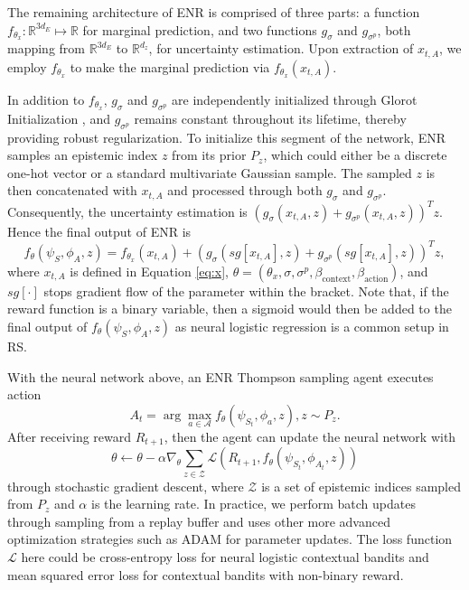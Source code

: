 The remaining architecture of ENR is comprised of three parts: a function $f_{\theta_x}: \mathbb{R}^{3d_E} \mapsto \mathbb{R}$ for marginal prediction, and two functions $g_{\sigma}$ and $g_{\sigma^p}$, both mapping from $\mathbb{R}^{3d_E}$ to $\mathbb{R}^{d_z}$, for uncertainty estimation. Upon extraction of $x_{t, A}$, we employ $f_{\theta_x}$ to make the marginal prediction via $f_{\theta_x}(x_{t,A})$.

In addition to $f_{\theta_x}$, $g_{\sigma}$ and $g_{\sigma^p}$ are independently initialized through Glorot Initialization \cite{glorot2010understanding, bartlett2017spectrally}, and $g_{\sigma^p}$ remains constant throughout its lifetime, thereby providing robust regularization. To initialize this segment of the network, ENR samples an epistemic index $z$ from its prior $P_z$, which could either be a discrete one-hot vector or a standard multivariate Gaussian sample. The sampled $z$ is then concatenated with $x_{t, A}$ and processed through both $g_{\sigma}$ and $g_{\sigma^p}$. Consequently, the uncertainty estimation is $(g_{\sigma}(x_{t, A}, z) + g_{\sigma^p}(x_{t, A}, z))^T z$. Hence the final output of ENR is
\begin{equation} \label{eq:forward}
    f_\theta(\psi_S, \phi_A, z) = f_{\theta_x}(x_{t, A}) + (g_{\sigma}(sg[x_{t, A}], z) + g_{\sigma^p}(sg[x_{t, A}], z))^T z,
\end{equation}
where $x_{t, A}$ is defined in Equation \ref{eq:x}, $\theta = (\theta_x, \sigma, \sigma^p, \beta_{\text{context}}, \beta_{\text{action}})$, and $sg[\cdot]$ stops gradient flow of the parameter within the bracket. Note that, if the reward function is a binary variable, then a sigmoid would then be added to the final output of $f_\theta(\psi_S, \phi_A, z)$ as neural logistic regression is a common setup in RS. 

With the neural network above, an ENR Thompson sampling agent executes action 
\begin{equation}
    A_t = \arg\max_{a \in \mathcal{A}}f_\theta(\psi_{S_t}, \phi_a, z), z \sim P_z.
\end{equation}
After receiving reward $R_{t+1}$, then the agent can update the neural network with 
\begin{equation}
    \theta \leftarrow \theta - \alpha\nabla_{\theta}\sum_{z\in \mathcal{Z}}\mathcal{L}(R_{t+1}, f_\theta(\psi_{S_t}, \phi_{A_t}, z))
\end{equation}
through stochastic gradient descent, where $\mathcal{Z}$ is a set of epistemic indices sampled from $P_z$ and $\alpha$ is the learning rate. In practice, we perform batch updates through sampling from a replay buffer and uses other more advanced optimization strategies such as ADAM \cite{kingma2015adam} for parameter updates. The loss function $\mathcal{L}$ here could be cross-entropy loss for neural logistic contextual bandits and mean squared error loss for contextual bandits with non-binary reward. 

